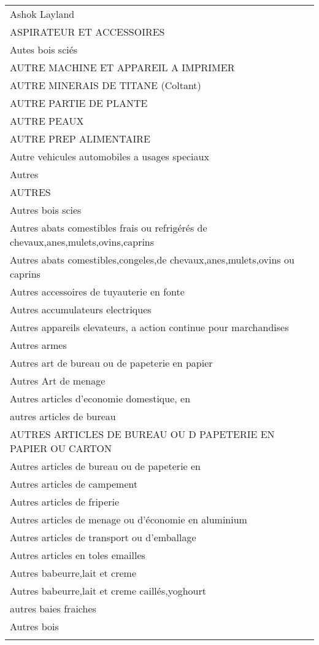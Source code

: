\documentclass[
]{book}
\begin{document}
\begin{longtable}[t]{l}
Ashok Layland\\
ASPIRATEUR ET ACCESSOIRES\\
Autes bois sciés\\
\addlinespace
AUTRE MACHINE ET APPAREIL A IMPRIMER\\
AUTRE MINERAIS DE TITANE (Coltant)\\
AUTRE PARTIE DE PLANTE\\
AUTRE PEAUX\\
AUTRE PREP ALIMENTAIRE\\
\addlinespace
Autre vehicules automobiles a usages speciaux\\
Autres\\
AUTRES\\
Autres  bois scies\\
Autres abats comestibles frais ou refrigérés de chevaux,anes,mulets,ovins,caprins\\
\addlinespace
Autres abats comestibles,congeles,de chevaux,anes,mulets,ovins ou caprins\\
Autres accessoires de tuyauterie en fonte\\
Autres accumulateurs electriques\\
Autres appareils elevateurs, a action continue pour marchandises\\
Autres armes\\
\addlinespace
Autres art de bureau ou de papeterie en papier\\
Autres Art de menage\\
Autres articles d'economie domestique, en\\
autres articles de bureau\\
AUTRES ARTICLES DE BUREAU OU D PAPETERIE EN PAPIER OU CARTON\\
\addlinespace
Autres articles de bureau ou de papeterie en\\
Autres articles de campement\\
Autres articles de friperie\\
Autres articles de menage ou d'économie en aluminium\\
Autres articles de transport ou d'emballage\\
\addlinespace
Autres articles en toles emailles\\
Autres babeurre,lait et creme\\
Autres babeurre,lait et creme caillés,yoghourt\\
autres baies fraiches\\
Autres bois\\
\addlinespace

\end{longtable}
\end{document}
